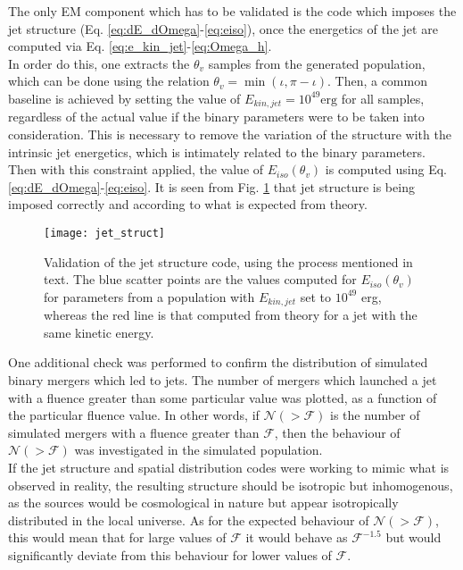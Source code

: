     The only EM component which has to be validated is the code which imposes the jet
    structure (Eq. \ref{eq:dE_dOmega}-\ref{eq:eiso}), once the energetics of the jet are
    computed via Eq. \ref{eq:e_kin_jet}-\ref{eq:Omega_h}.\\
    In order do this, one extracts the $\theta_v$ samples from the generated population,
    which can be done using the relation $\theta_v = \min(\iota, \pi - \iota)$. Then, a
    common baseline is achieved by setting the value of $E_{kin, jet} = 10^{49} \text{
    erg}$ for all samples, regardless of the actual value if the binary parameters were
    to be taken into consideration. This is necessary to remove the variation of the
    structure with the intrinsic jet energetics, which is intimately related to the
    binary parameters.\\
    Then with this constraint applied, the value of $E_{iso}(\theta_v)$ is computed
    using Eq.  \ref{eq:dE_dOmega}-\ref{eq:eiso}. It is seen from Fig.
    \ref{fig:jet_struct} that jet structure is being imposed correctly and according to
    what is expected from theory.

    \begin{figure}[H]
        \centering
        \texttt{[image: jet\_struct]}
        \caption[Validation of the jet structure code]{
            Validation of the jet structure code, using the process mentioned in text.
            The blue scatter points are the values computed for $E_{iso}(\theta_v)$ for
            parameters from a population with $E_{kin, jet}$ set to $10^{49}$ erg,
            whereas the red line is that computed from theory for a jet with the same
            kinetic energy.
        }
        \label{fig:jet_struct}
    \end{figure}

    One additional check was performed to confirm the distribution of simulated binary
    mergers which led to jets. The number of  mergers which launched a jet with a
    fluence greater than some particular value was plotted, as a function of the
    particular fluence value. In other words, if $\mathcal{N}(>\mathcal{F})$ is the
    number of simulated mergers with a fluence greater than $\mathcal{F}$, then the
    behaviour of $\mathcal{N}(> \mathcal{F})$ was investigated in the simulated
    population.\\
    If the jet structure and spatial distribution codes were working to mimic what is
    observed in reality, the resulting structure should be isotropic but inhomogenous,
    as the sources would be cosmological in nature but appear isotropically distributed
    in the local universe. As for the expected behaviour of $\mathcal{N}(>
    \mathcal{F})$, this would mean that for large values of $\mathcal{F}$ it would
    behave as $\mathcal{F}^{-1.5}$ but would significantly deviate from this behaviour
    for lower values of $\mathcal{F}$.

